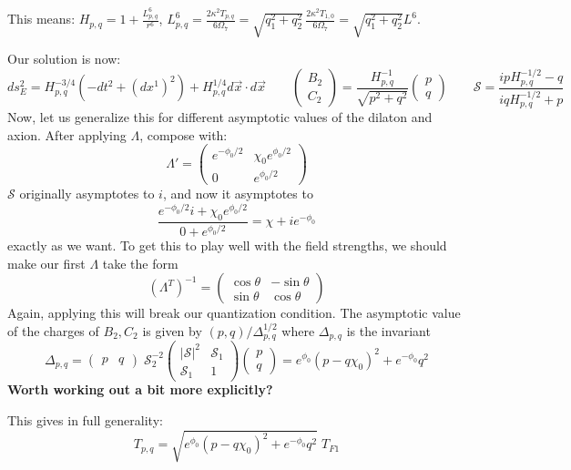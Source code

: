 \documentclass[11pt, class=article, crop=false]{standalone}
\begin{document}
\begin{enumerate}
	This means: $H_{p,q} = 1 + \frac{L^6_{p,q}}{r^6}$, $L_{p,q}^6 = \frac{2 \kappa^2 T_{p,q}}{6 \Omega_7} = \sqrt{q_1^2 + q_2^2}\,  \frac{2 \kappa^2 T_{1,0}}{6 \Omega_7} = \sqrt{q_1^2 + q_2^2} L^6$.
	
	Our solution is now:
	\[
		ds^2_E = H_{p,q}^{-3/4} (-dt^2 + (dx^1)^2) + H_{p,q}^{1/4} d\vec x \cdot d \vec x \qquad \begin{pmatrix}
			B_2\\ C_2
		\end{pmatrix} = \frac{H_{p,q}^{-1}}{\sqrt{p^2 + q^2}} \begin{pmatrix}
			p\\q
		\end{pmatrix}\qquad \mathcal S = \frac{i p H_{p,q}^{-1/2} - q}{i q H_{p,q}^{-1/2} + p}
	\]
	Now, let us generalize this for different asymptotic values of the dilaton and axion. After applying $\Lambda$, compose with:
	\[
		\Lambda' = \begin{pmatrix}
			e^{-\phi_0 / 2} & \chi_0 e^{\phi_0/2}\\
			0 & e^{\phi_0/2}
		\end{pmatrix}
	\]
	$\mathcal S$ originally asymptotes to $i$, and now it asymptotes to
	\[
		\frac{e^{-\phi_0/2} i + \chi_0 e^{\phi_0/2}}{0 + e^{\phi_0/2}} = \chi + i e^{-\phi_0}
	\]
	exactly as we want. To get this to play well with the field strengths, we should make our first $\Lambda$ take the form
	\[
		(\Lambda^T)^{-1} = \begin{pmatrix}
			\cos \theta & -\sin \theta\\
			\sin \theta & \cos \theta
		\end{pmatrix}
	\]
	Again, applying this will break our quantization condition. The asymptotic value of the charges of $B_2, C_2$ is given by $(p, q)/\Delta^{1/2}_{p,q}$ where $\Delta_{p,q}$ is the invariant
	\[
		\Delta_{p,q} = \begin{pmatrix}
			p & q
		\end{pmatrix} \;
		\mathcal S_2^{-2}
		\begin{pmatrix}
			|\mathcal S|^2 & \mathcal S_1\\
			\mathcal S_1 & 1
		\end{pmatrix}\begin{pmatrix}
			p \\ q
		\end{pmatrix}  = e^{\phi_0} (p - q \chi_0)^2 + e^{-\phi_0} q^2
	\]
	\textbf{Worth working out a bit more explicitly?}

	This gives in full generality:
	\[
		T_{p,q} = \sqrt{e^{\phi_0} (p - q \chi_0)^2 + e^{-\phi_0} q^2} \; T_{F1}
	\]
	

\end{enumerate}
\end{document}
